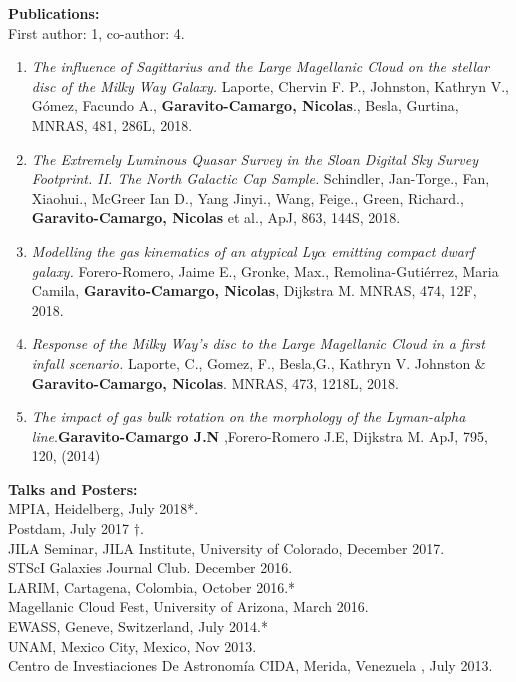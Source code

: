 \documentclass[letterpaper]{article}
\begin{document}
\textbf{\Large Publications:}\\

First author: 1, co-author: 4.\\

\begin{enumerate}
\item \textit{The influence of Sagittarius and the Large Magellanic Cloud on the stellar disc of the Milky Way Galaxy.} Laporte, Chervin F. P., Johnston, Kathryn V., Gómez, Facundo A., \textbf{Garavito-Camargo, Nicolas}., Besla, Gurtina, MNRAS, 481, 286L, 2018.

\item \textit{The Extremely Luminous Quasar Survey in the Sloan Digital Sky Survey Footprint. II. The North Galactic Cap Sample.} Schindler, Jan-Torge., Fan, Xiaohui., McGreer Ian D., Yang Jinyi., Wang, Feige., Green, Richard., \textbf{Garavito-Camargo, Nicolas} et al., ApJ, 863, 144S, 2018.

\item \textit{Modelling the gas kinematics of an atypical Ly$\alpha$ emitting compact dwarf galaxy.} Forero-Romero, Jaime E., Gronke, Max., Remolina-Gutiérrez, Maria Camila, \textbf{Garavito-Camargo, Nicolas}, Dijkstra M. MNRAS, 474, 12F, 2018.

\item \textit{Response of the Milky Way's disc to the Large Magellanic Cloud in a first infall scenario.} Laporte, C., Gomez, F., Besla,G., Kathryn V. Johnston \& \textbf{Garavito-Camargo, Nicolas}. MNRAS, 473, 1218L, 2018.

\item \textit{The impact of gas bulk rotation on the morphology of the Lyman-alpha line}.\textbf{Garavito-Camargo J.N} ,Forero-Romero J.E, Dijkstra M. ApJ, 795, 120, (2014)

\end{enumerate}

\textbf{\Large Talks and Posters:}\\

\indent MPIA, Heidelberg, July 2018*.\\
\indent Postdam, July 2017 $\dagger$.\\
\indent JILA Seminar, JILA Institute, University of Colorado, December 2017.\\
\indent STScI Galaxies Journal Club. December 2016.\\
\indent LARIM, Cartagena, Colombia, October 2016.*\\
\indent Magellanic Cloud Fest, University of Arizona, March 2016.\\
\indent EWASS, Geneve, Switzerland, July 2014.*\\
\indent UNAM, Mexico City, Mexico, Nov 2013. \\
\indent Centro de Investiaciones De Astronom\'ia CIDA, Merida, Venezuela , July 2013.\\
\end{document}
